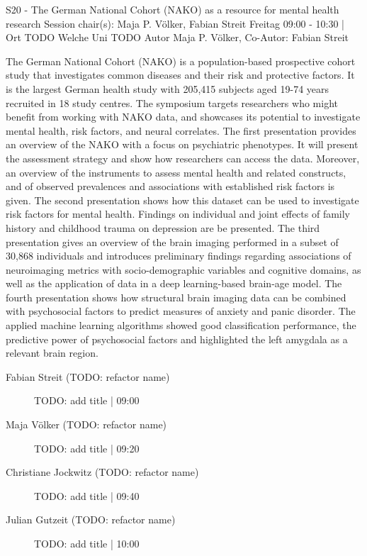 
            \begin{symposium}
            {S20 - The German National Cohort (NAKO) as a resource for mental health research}
            {Session chair(s): Maja P. Völker, Fabian Streit}
            {Freitag 09:00 - 10:30 | Ort TODO}
            {Welche Uni TODO}
            Autor Maja P. Völker, Co-Autor: Fabian Streit

The German National Cohort (NAKO) is a population-based prospective cohort study that investigates common diseases and their risk and protective factors. It is the largest German health study with 205,415 subjects aged 19-74 years recruited in 18 study centres. The symposium targets researchers who might benefit from working with NAKO data, and showcases its potential to investigate mental health, risk factors, and neural correlates. The first presentation provides an overview of the NAKO with a focus on psychiatric phenotypes. It will present the assessment strategy and show how researchers can access the data. Moreover, an overview of the instruments to assess mental health and related constructs, and of observed prevalences and associations with established risk factors is given. The second presentation shows how this dataset can be used to investigate risk factors for mental health. Findings on individual and joint effects of family history and childhood trauma on depression are be presented. The third presentation gives an overview of the brain imaging performed in a subset of 30,868 individuals and introduces preliminary findings regarding associations of neuroimaging metrics with socio-demographic variables and cognitive domains, as well as the application of data in a deep learning-based brain-age model. The fourth presentation shows how structural brain imaging data can be combined with psychosocial factors to predict measures of anxiety and panic disorder. The applied machine learning algorithms showed good classification performance, the predictive power of psychosocial factors and highlighted the left amygdala as a relevant brain region.
            \begin{description}    
            
                \item [Fabian Streit  (TODO: refactor name)] TODO: add title \textcolor{mygray}{ | 09:00}    
                
                \item [Maja Völker (TODO: refactor name)] TODO: add title \textcolor{mygray}{ | 09:20}    
                
                \item [Christiane Jockwitz (TODO: refactor name)] TODO: add title \textcolor{mygray}{ | 09:40}    
                
                \item [Julian Gutzeit (TODO: refactor name)] TODO: add title \textcolor{mygray}{ | 10:00}    
                
            \end{description} 
            \end{symposium}
            